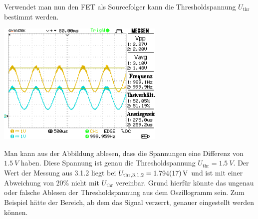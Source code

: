 \documentclass[10pt]{article}
\newenvironment{Figure}
  {\par\medskip\noindent\minipage{\linewidth}}
  {\endminipage\par\medskip}
\begin{document}
\begin{multicols}{2}
	Verwendet man nun den FET als Sourcefolger kann die Thresholdspannung $U_{\text{thr}}$ bestimmt werden.
	\begin{Figure}
		\centering
		\includegraphics[width=0.6\textwidth]{../data/DS0013.png}
	\end{Figure}
	Man kann aus der Abbildung ablesen, dass die Spannungen eine Differenz von $\SI{1.5}{V}$ haben.
	Diese Spannung ist genau die Thresholdspannung $U_{\text{thr}}=\SI{1.5}{V}$.
	Der Wert der Messung aus 3.1.2 liegt bei $U_{\text{thr},3.1.2}=\SI{1.794+-0.017}{V}$ und ist mit einer Abweichung von $20\%$ nicht mit $U_{\text{thr}}$ vereinbar.
	Grund hierfür könnte das ungenau oder falsche Ablesen der Thresholdspannung aus dem Oszillogramm sein.
	Zum Beispiel hätte der Bereich, ab dem das Signal verzerrt, genauer eingestellt werden können.


\end{multicols}
\end{document}
